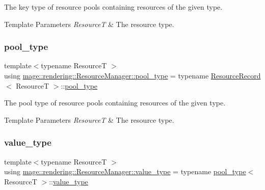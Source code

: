 The key type of resource pools containing resources of the given type.


\begin{DoxyTemplParams}{Template Parameters}
{\em ResourceT} & The resource type. \\
\hline
\end{DoxyTemplParams}
\hypertarget{classmage_1_1rendering_1_1_resource_manager_ab21a4e280087032ee533f267bd9bf602}{}\label{classmage_1_1rendering_1_1_resource_manager_ab21a4e280087032ee533f267bd9bf602} 
\subsubsection{\texorpdfstring{pool\+\_\+type}{pool\_type}}
{\footnotesize\ttfamily template$<$typename ResourceT $>$ \\
using \hyperlink{classmage_1_1rendering_1_1_resource_manager_ab21a4e280087032ee533f267bd9bf602}{mage\+::rendering\+::\+Resource\+Manager\+::pool\+\_\+type} =  typename \hyperlink{structmage_1_1rendering_1_1_resource_manager_1_1_resource_record}{Resource\+Record}$<$ ResourceT $>$\+::\hyperlink{classmage_1_1rendering_1_1_resource_manager_ab21a4e280087032ee533f267bd9bf602}{pool\+\_\+type}}

The pool type of resource pools containing resources of the given type.


\begin{DoxyTemplParams}{Template Parameters}
{\em ResourceT} & The resource type. \\
\hline
\end{DoxyTemplParams}
\hypertarget{classmage_1_1rendering_1_1_resource_manager_abb6ad8fd8054364a230839110c42174f}{}\label{classmage_1_1rendering_1_1_resource_manager_abb6ad8fd8054364a230839110c42174f} 
\subsubsection{\texorpdfstring{value\+\_\+type}{value\_type}}
{\footnotesize\ttfamily template$<$typename ResourceT $>$ \\
using \hyperlink{classmage_1_1rendering_1_1_resource_manager_abb6ad8fd8054364a230839110c42174f}{mage\+::rendering\+::\+Resource\+Manager\+::value\+\_\+type} =  typename \hyperlink{classmage_1_1rendering_1_1_resource_manager_ab21a4e280087032ee533f267bd9bf602}{pool\+\_\+type}$<$ ResourceT $>$\+::\hyperlink{classmage_1_1rendering_1_1_resource_manager_abb6ad8fd8054364a230839110c42174f}{value\+\_\+type}}

